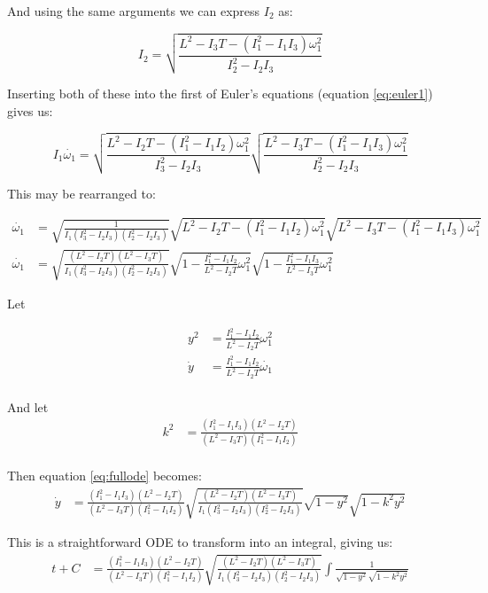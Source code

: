 \documentclass[a4paper, 12pt]{article}
\begin{document}
And using the same arguments we can express $I_2$ as:

\begin{equation}
  I_2 =\sqrt{\frac{L^2 - I_3T - (I_1^2 - I_1I_3)\omega_1^2}{I_2^2 - I_2I_3}}
\end{equation}


Inserting both of these into the first of Euler's equations (equation \ref{eq:euler1}) gives us:

\begin{equation}
  I_1\dot{\omega_1} = \sqrt{\frac{L^2 - I_2T - (I_1^2 - I_1I_2)\omega_1^2}{I_3^2 - I_2I_3}}\sqrt{\frac{L^2 - I_3T - (I_1^2 - I_1I_3)\omega_1^2}{I_2^2 - I_2I_3}}
\end{equation}

This may be rearranged to:

  \begin{align}
    \dot{\omega_1} &= \sqrt{\frac{1}{I_1(I_3^2 - I_2I_3)(I_2^2 - I_2I_3)}}\sqrt{L^2 - I_2T - (I_1^2 - I_1I_2)\omega_1^2}\sqrt{L^2 - I_3T - (I_1^2 - I_1I_3)\omega_1^2} \\
    \dot{\omega_1} &= \sqrt{\frac{(L^2 - I_2T)(L^2 - I_3T)}{I_1(I_3^2 - I_2I_3)(I_2^2 - I_2I_3)}}\sqrt{ 1 - \frac{I_1^2 - I_1I_2}{L^2 - I_2T}\omega_1^2}\sqrt{ 1 - \frac{I_1^2 - I_1I_3}{L^2 - I_3T}\omega_1^2}\label{eq:fullode}
  \end{align}

Let

\begin{align}
  y^2 &= \frac{I_1^2 - I_1I_2}{L^2 - I_2T}\omega_1^2 \\
  \dot{y} &= \frac{I_1^2 - I_1I_2}{L^2 - I_2T}\dot{\omega_1} \\
\end{align}

And let
\begin{align}
  k^2 & = \frac{(I_1^2 - I_1I_3)(L^2 - I_2T)}{(L^2 - I_3T)(I_1^2 - I_1I_2)} \\  
\end{align}

Then equation \ref{eq:fullode} becomes:
\begin{align}
  \dot{y}&=\frac{(I_1^2 - I_1I_3)(L^2 - I_2T)}{(L^2 - I_3T)(I_1^2 - I_1I_2)}\sqrt{\frac{(L^2 - I_2T)(L^2 - I_3T)}{I_1(I_3^2 - I_2I_3)(I_2^2 - I_2I_3)}}\sqrt{ 1 - y^2}\sqrt{ 1 - k^2y^2}
\end{align}

This is a straightforward ODE to transform into an integral, giving us:
\begin{align}
  t + C &=\frac{(I_1^2 - I_1I_3)(L^2 - I_2T)}{(L^2 - I_3T)(I_1^2 - I_1I_2)}\sqrt{\frac{(L^2 - I_2T)(L^2 - I_3T)}{I_1(I_3^2 - I_2I_3)(I_2^2 - I_2I_3)}}\int\frac{1}{\sqrt{ 1 - y^2}\sqrt{ 1 - k^2y^2}}
\end{align}
\end{document}
